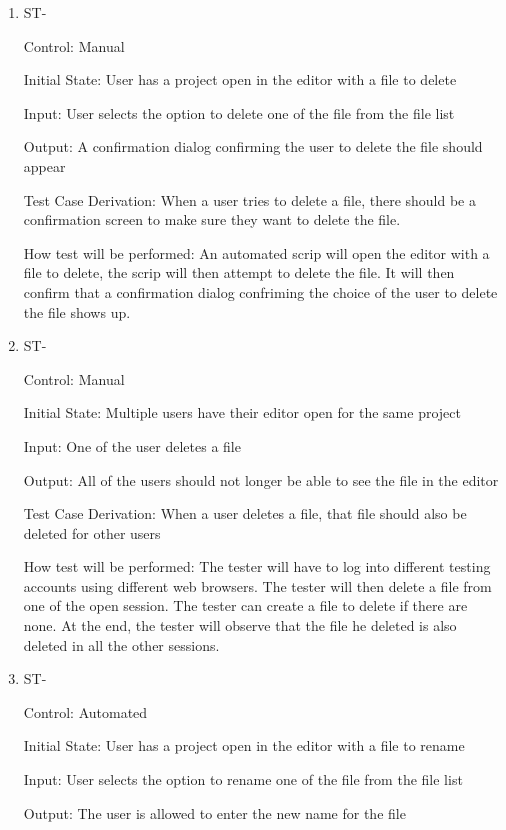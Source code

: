 \documentclass[12pt, titlepage]{article}
\newcounter{TESTID}
\newcommand\TESTNUM{\stepcounter{TESTID}\theTESTID}
\begin{document}
\begin{enumerate}
		\item{ST-\TESTNUM\\}
		
		Control: Manual
		
		Initial State: User has a project open in the editor with a file to delete
		
		Input: User selects the option to delete one of the file from the file list
		
		Output: A confirmation dialog confirming the user to delete the file should appear
		
		Test Case Derivation: When a user tries to delete a file, there should be a confirmation screen to make sure they want to delete the file.
		
		How test will be performed: An automated scrip will open the editor with a file to delete, the scrip will then attempt to delete the file. It will then confirm that a confirmation dialog confriming the choice of the user to delete the file shows up.
		
		\item{ST-\TESTNUM\\}
		
		Control: Manual
		
		Initial State: Multiple users have their editor open for the same project
		
		Input: One of the user deletes a file
		
		Output: All of the users should not longer be able to see the file in the editor
		
		Test Case Derivation: When a user deletes a file, that file should also be deleted for other users
		
		How test will be performed: The tester will have to log into different testing accounts using different web browsers. The tester will then delete a file from one of the open session. The tester can create a file to delete if there are none. At the end, the tester will observe that the file he deleted is also deleted in all the other sessions.
		
		\item{ST-\TESTNUM\\}
		
		Control: Automated
		
		Initial State: User has a project open in the editor with a file to rename
		
		Input: User selects the option to rename one of the file from the file list
		
		Output: The user is allowed to enter the new name for the file
		

\end{enumerate}
\end{document}
